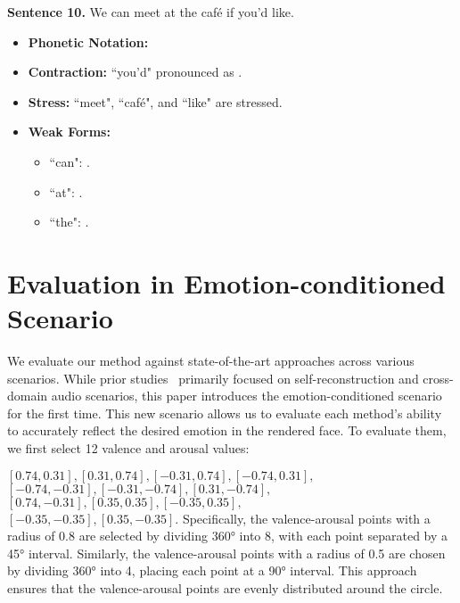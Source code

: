 \begin{description}
    \item \textbf{Sentence 10.} We can meet at the café if you'd like.
    \begin{itemize}
        \item \textbf{Phonetic Notation:} 
        \item \textbf{Contraction:} ``you'd" pronounced as .
        \item \textbf{Stress:} ``meet", ``café", and ``like" are stressed.
        \item \textbf{Weak Forms:}
            \begin{itemize}
            \item ``can": .
            \item ``at": .
            \item ``the": .
            \end{itemize}
    \end{itemize}
\end{description}

\section{Evaluation in Emotion-conditioned Scenario}
We evaluate our method against state-of-the-art approaches across various scenarios. While prior studies~\cite{li2023efficient,cho2024gaussiantalker,li2024talkinggaussian} primarily focused on self-reconstruction and cross-domain audio scenarios, this paper introduces the emotion-conditioned scenario for the first time. This new scenario allows us to evaluate each method's ability to accurately reflect the desired emotion in the rendered face. To evaluate them, we first select 12 valence and arousal values:

\noindent\([0.74, 0.31], [0.31, 0.74], [-0.31, 0.74], [-0.74, 0.31],\)
\\
\([-0.74, -0.31], [-0.31, -0.74], [0.31, -0.74],\) \\
\([0.74, -0.31], [0.35, 0.35], [-0.35, 0.35],\) \\
\([-0.35, -0.35], [0.35, -0.35]\).
Specifically, the valence-arousal points with a radius of 0.8 are selected by dividing 360° into 8, with each point separated by a 45° interval. Similarly, the valence-arousal points with a radius of 0.5 are chosen by dividing 360° into 4, placing each point at a 90° interval. This approach ensures that the valence-arousal points are evenly distributed around the circle.

